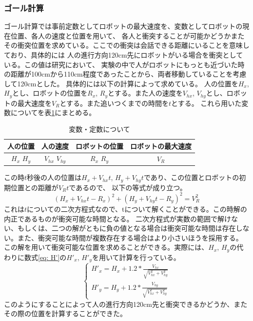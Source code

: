 \documentclass{kuisthesis}
\begin{document}
\subsubsection{ゴール計算}
ゴール計算では事前定数としてロボットの最大速度を、変数としてロボットの現在位置、各人の速度と位置を用いて、
各人と衝突することが可能かどうかまたその衝突位置を求めている。ここでの衝突は会話できる距離にいることを意味しており、具体的には
人の進行方向120cm先にロボットがいる場合を衝突としている。この値は研究\cite{mumm2011human}において、
実験の中で人がロボットにもっとも近づいた時の距離が100cmから110cm程度であったことから、両者移動していることを考慮して120cmとした。
具体的には以下の計算によって求めている。
人の位置を$H_x$, $H_y$とし、ロボットの位置を$R_x$, $R_y$とする。また人の速度を$V_{hx}$, $V_{hy}$とし、ロボットの最大速度を$V_R$とする。また追いつくまでの時間を$t$とする。
これら用いた変数についてを表\ref{fig: variable}にまとめる。
\begin{table}[H]
  \centering
  \begin{tabular}{|c|c|c|c|}
    \hline
    人の位置 & 人の速度 & ロボットの位置 & ロボットの最大速度 \\ \hline
    $H_x$  $H_y$ & $V_{hx}$  $V_{hy}$ & $R_x$  $R_y$ & $V_R$ \\ \hline
  \end{tabular}
  \caption{変数・定数について}
  \label{fig: variable}
\end{table}
この時$t$秒後の人の位置は$H_x + V_{hx}t$, $H_y + V_{hy}t$であり、この位置とロボットの初期位置との距離が$V_Rt$であるので、
以下の等式が成り立つ。\begin{equation}(H_x + V_{hx}t - R_x)^{2} + (H_y + V_{hy}t - R_y)^2 = V_R^2\end{equation}
これは$t$についての二次方程式なので、tについて解くことができる。この時解の内正であるものが衝突可能な時間となる。
二次方程式が実数の範囲で解けない、もしくは、二つの解がともに負の値となる場合は衝突可能な時間は存在しない。また、衝突可能な時間が複数存在する場合はより小さいほうを採用する。
この解を用いて衝突可能な位置を求めることができる。実際には、$H_x$, $H_y$の代わりに数式\ref{eq: H'}の$H'_x$, $H'_y$を用いて計算を行っている。
\begin{equation}
  \label{eq: H'}
\left\{\begin{array}{l}
H'_x = H_x + 1.2*\frac{V_{hx}}{\sqrt{{V_{hx}^2 + V_{hy}^2}}}\\
H'_y = H_y + 1.2 * \frac{V_{hy}}{\sqrt{V_{hx}^2 + V_{hy}^2}}
\end{array}\right.
\end{equation}
このようにすることによって人の進行方向120cm先と衝突できるかどうか、またその際の位置を計算することができた。
\end{document}
